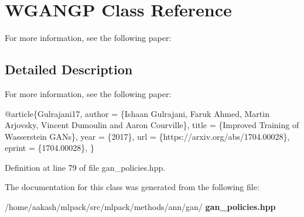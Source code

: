 \section{W\+G\+A\+N\+GP Class Reference}
\label{classmlpack_1_1ann_1_1WGANGP}


For more information, see the following paper\+:  




\subsection{Detailed Description}
For more information, see the following paper\+: 


\begin{DoxyCode}
@article\{Gulrajani17,
  author    = \{Ishaan Gulrajani, Faruk Ahmed, Martin Arjovsky, Vincent
               Dumoulin and Aaron Courville\},
  title     = \{Improved Training of Wasserstein GANs\},
  year      = \{2017\},
  url       = \{https:\textcolor{comment}{//arxiv.org/abs/1704.00028\},}
  eprint    = \{1704.00028\},
\}
\end{DoxyCode}
 

Definition at line 79 of file gan\+\_\+policies.\+hpp.



The documentation for this class was generated from the following file\+:\begin{DoxyCompactItemize}
\item 
/home/aakash/mlpack/src/mlpack/methods/ann/gan/\textbf{ gan\+\_\+policies.\+hpp}\end{DoxyCompactItemize}
